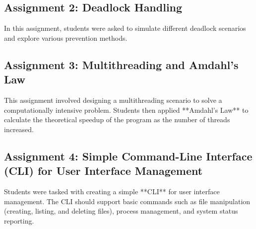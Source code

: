 \documentclass[12pt]{article}
\begin{document}
\subsection{Assignment 2: Deadlock Handling}
In this assignment, students were asked to simulate different deadlock scenarios and explore various prevention methods.

\subsection{Assignment 3: Multithreading and Amdahl's Law}
This assignment involved designing a multithreading scenario to solve a computationally intensive problem. Students then applied **Amdahl's Law** to calculate the theoretical speedup of the program as the number of threads increased.

\subsection{Assignment 4: Simple Command-Line Interface (CLI) for User Interface Management}
Students were tasked with creating a simple **CLI** for user interface management. The CLI should support basic commands such as file manipulation (creating, listing, and deleting files), process management, and system status reporting.
\end{document}
